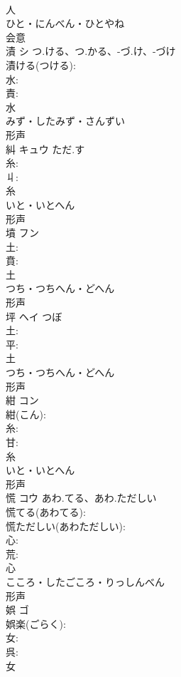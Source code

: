 \documentclass[8pt]{extreport}
\begin{document}
\begin{CJK}{UTF8}{min}
\\	人	
\\	ひと・にんべん・ひとやね	
\\	会意 
\\	漬	シ	つ.ける、つ.かる、-づ.け、-づけ		
\\	漬ける(つける): 
\\	水: 
\\	責: 
\\	水	
\\	みず・したみず・さんずい	
\\	形声 
\\	糾	キュウ	ただ.す		
\\	糸: 
\\	丩: 
\\	糸	
\\	いと・いとへん	
\\	形声 
\\	墳	フン			
\\	土: 
\\	賁: 
\\	土	
\\	つち・つちへん・どへん	
\\	形声 
\\	坪	ヘイ	つぼ		
\\	土: 
\\	平: 
\\	土	
\\	つち・つちへん・どへん	
\\	形声 
\\	紺	コン			
\\	紺(こん): 
\\	糸: 
\\	甘: 
\\	糸	
\\	いと・いとへん	
\\	形声 
\\	慌	コウ	あわ.てる、あわ.ただしい		
\\	慌てる(あわてる): 
\\	慌ただしい(あわただしい): 
\\	心: 
\\	荒: 
\\	心	
\\	こころ・したごころ・りっしんべん	
\\	形声 
\\	娯	ゴ			
\\	娯楽(ごらく): 
\\	女: 
\\	呉: 
\\	女	

\end{CJK}
\end{document}
